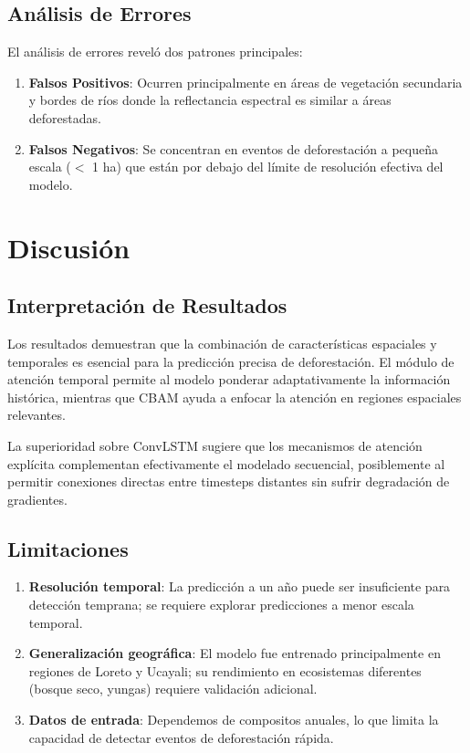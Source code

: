 \documentclass[conference]{IEEEtran}
\begin{document}
\subsection{Análisis de Errores}

El análisis de errores reveló dos patrones principales:
\begin{enumerate}
    \item \textbf{Falsos Positivos}: Ocurren principalmente en áreas de vegetación secundaria y bordes de ríos donde la reflectancia espectral es similar a áreas deforestadas.

    \item \textbf{Falsos Negativos}: Se concentran en eventos de deforestación a pequeña escala ($<$ 1 ha) que están por debajo del límite de resolución efectiva del modelo.
\end{enumerate}

\section{Discusión}

\subsection{Interpretación de Resultados}

Los resultados demuestran que la combinación de características espaciales y temporales es esencial para la predicción precisa de deforestación. El módulo de atención temporal permite al modelo ponderar adaptativamente la información histórica, mientras que CBAM ayuda a enfocar la atención en regiones espaciales relevantes.

La superioridad sobre ConvLSTM sugiere que los mecanismos de atención explícita complementan efectivamente el modelado secuencial, posiblemente al permitir conexiones directas entre timesteps distantes sin sufrir degradación de gradientes.

\subsection{Limitaciones}

\begin{enumerate}
    \item \textbf{Resolución temporal}: La predicción a un año puede ser insuficiente para detección temprana; se requiere explorar predicciones a menor escala temporal.

    \item \textbf{Generalización geográfica}: El modelo fue entrenado principalmente en regiones de Loreto y Ucayali; su rendimiento en ecosistemas diferentes (bosque seco, yungas) requiere validación adicional.

    \item \textbf{Datos de entrada}: Dependemos de compositos anuales, lo que limita la capacidad de detectar eventos de deforestación rápida.
\end{enumerate}
\end{document}
